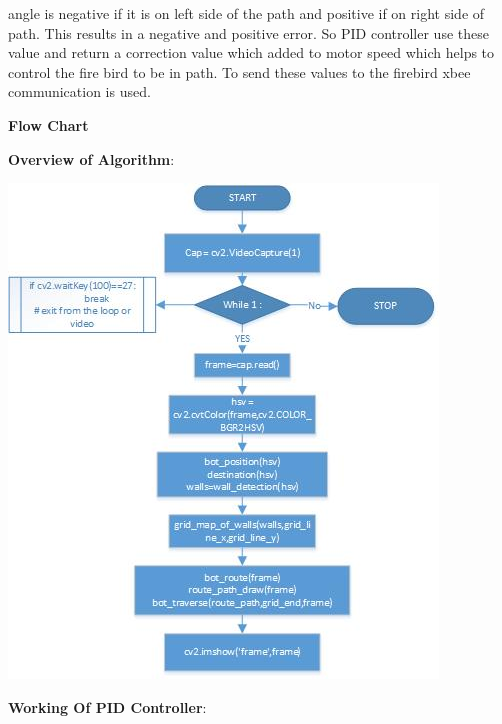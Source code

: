 \documentclass[report]{res}
\begin{document}
	angle is negative if it is on left side of the path and positive if on right side of path. This results in a negative and positive error. So PID controller use these value and return a correction value which added to motor speed which helps to control the fire bird to be in path.
	To send these values to the firebird xbee communication is used.
	
	\pagebreak
	
	
	\begin{center}
		\textbf{\huge Flow Chart} \\
	\end{center}
	
	\textbf{\Large Overview of Algorithm}:\\
	
	\begin{center}
	\includegraphics[scale = 1.4]{graphics/drawing1.jpg}\\
	\end{center}
	
	\textbf{\Large Working Of PID Controller}:\\
	
\end{document}

